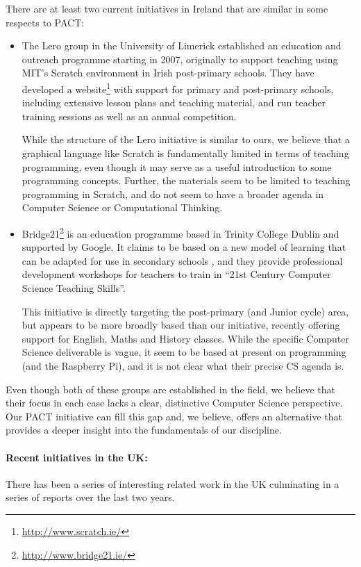 \documentclass[a4paper]{article}
\begin{document}
There are at least two current initiatives in Ireland that are similar in some respects to PACT:

\begin{itemize}

\item The Lero group in the University of Limerick  established an education and outreach programme starting in 2007, originally to support teaching using MIT's Scratch environment in Irish post-primary schools.  They have developed a website\footnote{\url{http://www.scratch.ie/}}
with support for primary and post-primary schools, including extensive lesson plans and teaching material, and run teacher training sessions as well as an annual competition.

While the structure of the Lero initiative is similar to ours, we believe that a graphical language like Scratch is fundamentally limited in terms of teaching programming, even though it may serve as a useful introduction to some programming concepts.  Further, the materials seem to be limited to teaching programming in Scratch, and do not seem to have a broader agenda in Computer Science or Computational Thinking.

\item Bridge21\footnote{\url{http://www.bridge21.ie/}} is an education programme based in Trinity College Dublin and supported by Google.  It claims to be based on a new model of learning that can be adapted for use in secondary schools \cite{conneely13}, and they provide professional development workshops for teachers to train in ``21st Century Computer Science Teaching Skills''. 

This initiative is directly targeting the post-primary (and Junior cycle) area, but appears to be more broadly based than our initiative, recently offering support for English, Maths and History classes.  While the specific Computer Science deliverable is vague, it seem to be based at present on programming (and the Raspberry Pi), and it is not clear what their precise CS agenda is.
\end{itemize}

Even though both of these groups are established in the field, we believe that their focus in each case lacks a clear, distinctive Computer Science perspective.  Our PACT initiative can fill this gap and, we believe, offers an alternative that provides a deeper insight into the fundamentals of our discipline.



\paragraph{Recent initiatives in the UK:}  There has been a series of interesting related work in the UK culminating in a series of reports over the last two years.
\end{document}
